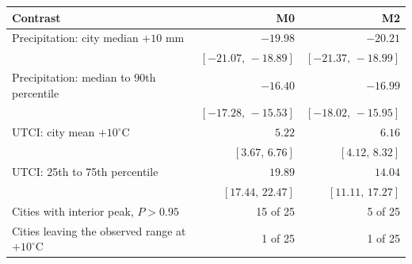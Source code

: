 \begin{tabular}{lrr}
\toprule
Contrast & M0 & M2 \\
\midrule
Precipitation: city median $+10$ mm & $-19.98$ & $-20.21$ \\
 & $[-21.07,\,-18.89]$ & $[-21.37,\,-18.99]$ \\
Precipitation: median to 90th percentile & $-16.40$ & $-16.99$ \\
 & $[-17.28,\,-15.53]$ & $[-18.02,\,-15.95]$ \\
UTCI: city mean $+10^\circ$C & $5.22$ & $6.16$ \\
 & $[3.67,\,6.76]$ & $[4.12,\,8.32]$ \\
UTCI: 25th to 75th percentile & $19.89$ & $14.04$ \\
 & $[17.44,\,22.47]$ & $[11.11,\,17.27]$ \\
Cities with interior peak, $P>0.95$ & 15 of 25 & 5 of 25 \\
Cities leaving the observed range at $+10^\circ$C & 1 of 25 & 1 of 25 \\
\bottomrule
\end{tabular}
